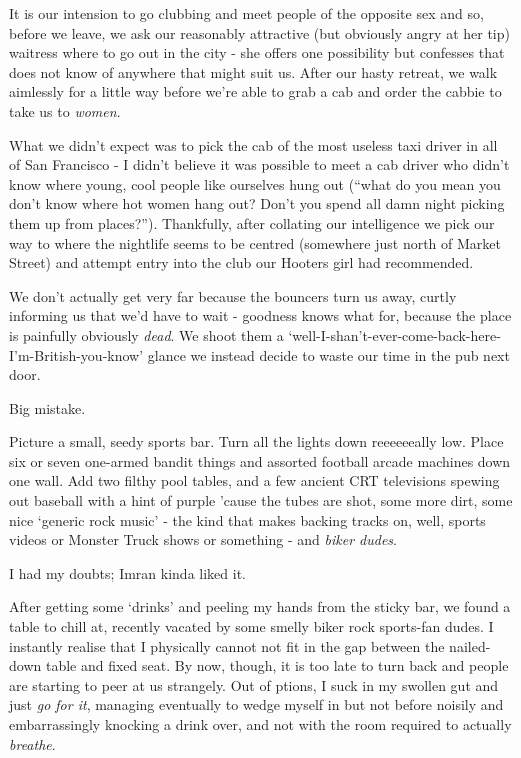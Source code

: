 \documentclass[a5paper,titlepage,11pt]{book}
\begin{document}
It is our intension to go clubbing and meet people of the opposite sex and so, before we leave, we ask our reasonably attractive (but obviously angry at her tip) waitress where to go out in the city - she offers one possibility but confesses that does not know of anywhere that might suit us.  After our hasty retreat, we walk aimlessly for a little way before we're able to grab a cab and order the cabbie to take us to \emph{women}.

What we didn't expect was to pick the cab of the most useless taxi driver in all of San Francisco - I didn't believe it was possible to meet a cab driver who didn't know where young, cool people like ourselves hung out (``what do you mean you don't know where hot women hang out?  Don't you spend all damn night picking them up from places?'').  Thankfully, after collating our intelligence we pick our way to where the nightlife seems to be centred (somewhere just north of Market Street) and attempt entry into the club our Hooters girl had recommended.

We don't actually get very far because the bouncers turn us away, curtly informing us that we'd have to wait - goodness knows what for, because the place is painfully obviously \emph{dead}.  We shoot them a `well-I-shan't-ever-come-back-here-I'm-British-you-know' glance we instead decide to waste our time in the pub next door.

Big mistake.

Picture a small, seedy sports bar.  Turn all the lights down reeeeeeally low.  Place six or seven one-armed bandit things and assorted football arcade machines down one wall.  Add two filthy pool tables, and a few ancient CRT televisions spewing out baseball with a hint of purple 'cause the tubes are shot, some more dirt, some nice `generic rock music' - the kind that makes backing tracks on, well, sports videos or Monster Truck shows or something - and \emph{biker dudes}.

I had my doubts; Imran kinda liked it.

After getting some `drinks' and peeling my hands from the sticky bar, we found a table to chill at, recently vacated by some smelly biker rock sports-fan dudes.  I instantly realise that I physically cannot not fit in the gap between the nailed-down table and fixed seat.  By now, though, it is too late to turn back and people are starting to peer at us strangely.  Out of ptions, I suck in my swollen gut and just \emph{go for it}, managing eventually to wedge myself in but not before noisily and embarrassingly knocking a drink over, and not with the room required to actually \emph{breathe}.
\end{document}
